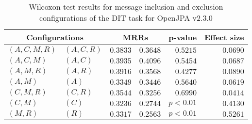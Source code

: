 
\begin{table}
\begin{spacing}{1.2}
\centering
\caption{Wilcoxon test results for message inclusion and exclusion configurations of the DIT task for OpenJPA v2.3.0}
\label{table:versus-wilcox-openjpa-dit-message}
\begin{tabular}{ll|rr|rr}
\toprule
      \multicolumn{2}{c|}{Configurations} &          \multicolumn{2}{c|}{MRRs} &       p-value & Effect size \\
\midrule
 $(A,C,M,R)$ &  $(A,C,R)$ & $0.3833$ & $0.3648$ & $0.5215$ &    $0.0690$ \\
   $(A,C,M)$ &    $(A,C)$ & $0.3935$ & $0.4096$ & $0.5454$ &    $0.0687$ \\
   $(A,M,R)$ &    $(A,R)$ & $0.3916$ & $0.3568$ & $0.4277$ &    $0.0890$ \\
     $(A,M)$ &      $(A)$ & $0.3349$ & $0.3446$ & $0.5640$ &    $0.0619$ \\
   $(C,M,R)$ &    $(C,R)$ & $0.3544$ & $0.3256$ & $0.6990$ &    $0.0414$ \\
     $(C,M)$ &      $(C)$ & $0.3236$ & $0.2744$ & $p<0.01$ &    $0.4130$ \\
     $(M,R)$ &      $(R)$ & $0.3317$ & $0.2563$ & $p<0.01$ &    $0.5261$ \\
\bottomrule
\end{tabular}

\end{spacing}
\end{table}

